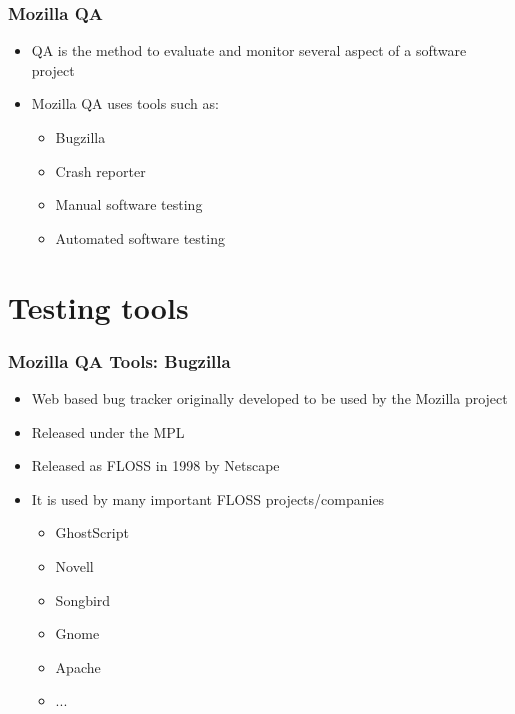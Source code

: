 \documentclass{beamer}
\begin{document}

\begin{frame}
 \frametitle{Mozilla QA}
 \begin{itemize}
 \item QA is the method to evaluate and monitor several aspect of a software project
 \item Mozilla QA uses tools such as:
    \begin{itemize}
     \item Bugzilla
     \item Crash reporter
     \item Manual software testing
     \item Automated software testing 
    \end{itemize}
 \end{itemize}
\end{frame}

\section{Testing tools}

\begin{frame}
 \frametitle{Mozilla QA Tools: Bugzilla}
 \begin{itemize}
 \item Web based bug tracker originally developed to be used by the Mozilla project
 \item Released under the MPL
 \item Released as FLOSS in 1998 by Netscape
 \item It is used by many important FLOSS projects/companies
    \begin{itemize}
    \item GhostScript
    \item Novell
    \item Songbird
    \item Gnome
    \item Apache
    \item ...
    \end{itemize}
 \end{itemize}
\end{frame}

\end{document}
